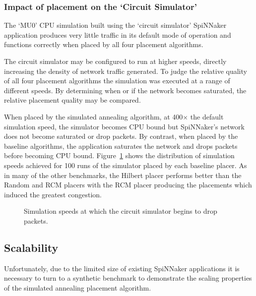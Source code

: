 			\subsubsection{Impact of placement on the `Circuit Simulator'}
				
				The `MU0' CPU simulation built using the `circuit simulator' SpiNNaker
				application produces very little traffic in its default mode of
				operation and functions correctly when placed by all four placement
				algorithms.
				
				The circuit simulator may be configured to run at higher speeds,
				directly increasing the density of network traffic generated. To judge
				the relative quality of all four placement algorithms the simulation
				was executed at a range of different speeds. By determining when or if
				the network becomes saturated, the relative placement quality may be
				compared.
				
				When placed by the simulated annealing algorithm, at 400$\times$ the
				default simulation speed, the simulator becomes CPU bound but
				SpiNNaker's network does not become saturated or drop packets. By
				contrast, when placed by the baseline algorithms, the application
				saturates the network and drops packets before becoming CPU bound.
				Figure~\ref{fig:mu0-saturation} shows the distribution of simulation
				speeds achieved for 100 runs of the simulator placed by each baseline
				placer. As in many of the other benchmarks, the Hilbert placer performs
				better than the Random and RCM placers with the RCM placer producing
				the placements which induced the greatest congestion.
				
				\begin{figure}
					\center
					
					\caption[Packet dropping in circuit simulator simulations.]%
					{Simulation speeds at which the circuit simulator begins to
					drop packets.}
					\label{fig:mu0-saturation}
				\end{figure}
			
		\subsection{Scalability}
			
			Unfortunately, due to the limited size of existing SpiNNaker applications
			it is necessary to turn to a synthetic benchmark to demonstrate the
			scaling properties of the simulated annealing placement algorithm.
			
